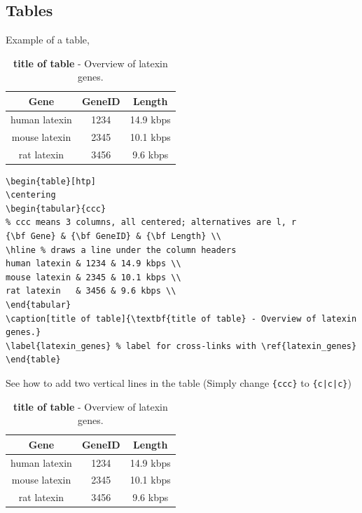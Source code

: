 \documentclass[11pt]{book}
\begin{document}
\subsection{Tables}\label{table}
Example of a table,
\begin{table}[htp]
\centering
\begin{tabular}{ccc} %
{\bf Gene} & {\bf GeneID} & {\bf Length} \\ 
\hline %
human latexin & 1234 & 14.9 kbps \\
mouse latexin & 2345 & 10.1 kbps \\
rat latexin   & 3456 & 9.6 kbps \\
\end{tabular}
\caption[title of table]{\textbf{title of table} - Overview of latexin genes.}
\label{latexin_genes} %
\end{table}
\begin{verbatim}
\begin{table}[htp]
\centering
\begin{tabular}{ccc} 
% ccc means 3 columns, all centered; alternatives are l, r
{\bf Gene} & {\bf GeneID} & {\bf Length} \\ 
\hline % draws a line under the column headers
human latexin & 1234 & 14.9 kbps \\
mouse latexin & 2345 & 10.1 kbps \\
rat latexin   & 3456 & 9.6 kbps \\
\end{tabular}
\caption[title of table]{\textbf{title of table} - Overview of latexin genes.}
\label{latexin_genes} % label for cross-links with \ref{latexin_genes}
\end{table}
\end{verbatim}
See how to add two vertical lines in the table (Simply change \verb+{ccc}+ to \verb+{c|c|c}+)
\begin{table}[htp]
\centering
\begin{tabular}{c|c|c} %
{\bf Gene} & {\bf GeneID} & {\bf Length} \\ 
\hline %
human latexin & 1234 & 14.9 kbps \\
mouse latexin & 2345 & 10.1 kbps \\
rat latexin   & 3456 & 9.6 kbps \\
\end{tabular}
\caption[title of table]{\textbf{title of table} - Overview of latexin genes.}
\label{latexin_genes2} %
\end{table}
\end{document}
